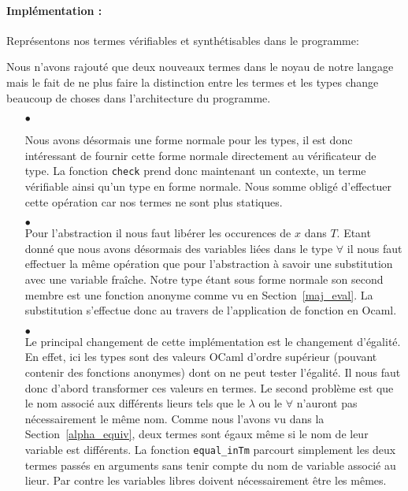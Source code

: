 \documentclass {article}
\newcommand{\codefrom}[3]
           {}
\theoremstyle{definition}
\theoremstyle{remark}
\newcommand{\fun}[1]{\lstinline!#1!}
\begin{document}
\paragraph{Implémentation :} 

Représentons nos termes vérifiables et synthétisables dans le programme:
\codefrom{dependent}{lambda}{inTm_head}
\codefrom{dependent}{lambda}{inTm}
\codefrom{dependent}{lambda}{exTm_head}
\codefrom{dependent}{lambda}{exTm}

Nous n'avons rajouté que deux nouveaux termes dans le noyau de notre langage mais 
le fait de ne plus faire la distinction entre les termes et les types change beaucoup de
choses dans l'architecture du programme. 


\begin{itemize}
\item[$\bullet$]

Nous avons désormais une forme normale pour les types, il est donc intéressant de 
fournir cette forme normale directement au vérificateur de type. La fonction \fun{check} prend donc maintenant
un contexte, un terme vérifiable ainsi qu'un type en forme normale. Nous somme obligé d'effectuer cette opération car
nos termes ne sont plus statiques.

  \codefrom{dependent}{lambda}{check_head}

\item[$\bullet$] \\

  Pour l'abstraction il nous faut libérer les occurences de $x$ dans $T$.
  Etant donné que nous avons désormais des variables liées dans le type $\forall$ il nous faut
  effectuer la même opération que pour l'abstraction à savoir une substitution avec une variable
  fraîche. Notre type étant sous forme normale son second membre est une fonction
  anonyme comme vu en Section~\ref{maj_eval}. La substitution s'effectue donc au travers de l'application de fonction en Ocaml.

  \codefrom{dependent}{lambda}{check_abs}
  
\item[$\bullet$] \\
  
  Le principal changement de cette implémentation est le changement d'égalité. 
  En effet, ici les types sont des valeurs OCaml d'ordre supérieur (pouvant contenir des fonctions anonymes) dont on ne peut 
  tester l'égalité. Il nous faut donc d'abord transformer 
  ces valeurs en termes. Le second problème est que le nom associé 
  aux différents lieurs tels que le $\lambda$ ou le $\forall$ n'auront pas nécessairement le 
  même nom. Comme nous l'avons vu dans la Section~\ref{alpha_equiv},
  deux termes sont égaux même si le nom de leur variable est différents. 
  La fonction \fun{equal_inTm} parcourt simplement les deux termes passés en arguments sans tenir compte
  du nom de variable associé au lieur. Par contre les variables libres doivent nécessairement être les mêmes.


\end{itemize}
\end{document}
